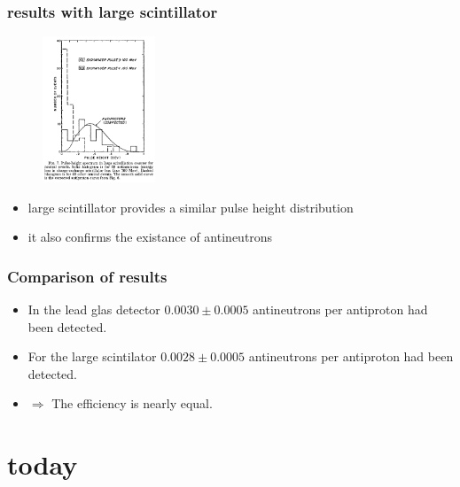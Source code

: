 \documentclass{beamer}
\begin{document}

\begin{frame}
\frametitle{results with large scintillator}
\begin{figure}
\includegraphics[width=0.3\textwidth]{result2}
\end{figure}
\begin{itemize}
  \item large scintillator provides a similar pulse height distribution
  \item it also confirms the existance of antineutrons
\end{itemize}
\end{frame}

\begin{frame}
\frametitle{Comparison of results}
\begin{itemize}
  \item In the lead glas detector $0.0030 \pm 0.0005$ antineutrons per antiproton had been detected.
  \item For the large scintilator $0.0028 \pm 0.0005$ antineutrons per antiproton had been detected.
  \item $\Rightarrow$ The efficiency is nearly equal.
\end{itemize}
\end{frame}


\section{today}
\label{sec:today}
\end{document}
